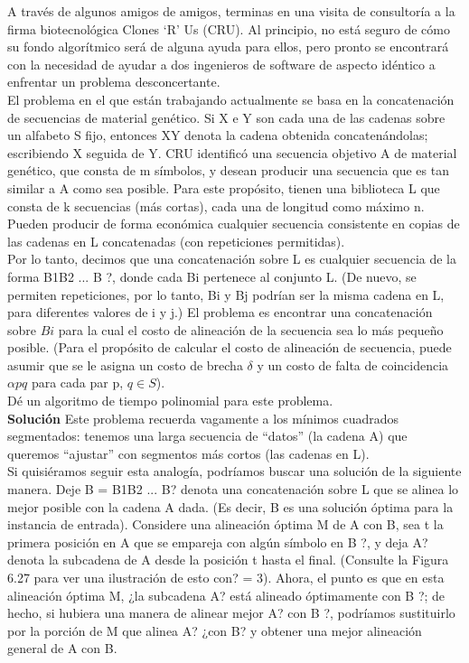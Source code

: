 \documentclass[a4paper, 12pt]{book}
\theoremstyle{dotless}
\begin{document}
A través de algunos amigos de amigos, terminas en una visita de consultoría a la firma biotecnológica Clones `R' Us (CRU). Al principio, no está seguro de cómo su fondo algorítmico será de alguna ayuda para ellos, pero pronto se encontrará con la necesidad de ayudar a dos ingenieros de software de aspecto idéntico a enfrentar un problema desconcertante.\\

El problema en el que están trabajando actualmente se basa en la concatenación de secuencias de material genético. Si X e Y son cada una de las cadenas sobre un alfabeto S fijo, entonces XY denota la cadena obtenida concatenándolas; escribiendo X seguida de Y. CRU identificó una secuencia objetivo A de material genético, que consta de m símbolos, y desean producir una secuencia que es tan similar a A como sea posible. Para este propósito, tienen una biblioteca L que consta de k secuencias (más cortas), cada una de longitud como máximo n. Pueden producir de forma económica cualquier secuencia consistente en copias de las cadenas en L concatenadas (con repeticiones permitidas).\\

Por lo tanto, decimos que una concatenación sobre L es cualquier secuencia de la forma B1B2 ... B ?, donde cada Bi pertenece al conjunto L. (De nuevo, se permiten repeticiones, por lo tanto, Bi y Bj podrían ser la misma cadena en L, para diferentes valores de i y j.) El problema es encontrar una concatenación sobre ${Bi}$ para la cual el costo de alineación de la secuencia sea lo más pequeño posible. (Para el propósito de calcular el costo de alineación de secuencia, puede asumir que se le asigna un costo de brecha $ \delta $ y un costo de falta de coincidencia $ \alpha pq$ para cada par p, $q \in S$).\\

Dé un algoritmo de tiempo polinomial para este problema.\\

\textbf{Solución} Este problema recuerda vagamente a los mínimos cuadrados segmentados: tenemos una larga secuencia de ``datos'' (la cadena A) que queremos ``ajustar'' con segmentos más cortos (las cadenas en L).\\

Si quisiéramos seguir esta analogía, podríamos buscar una solución de la siguiente manera. Deje B = B1B2 ... B? denota una concatenación sobre L que se alinea lo mejor posible con la cadena A dada. (Es decir, B es una solución óptima para la instancia de entrada). Considere una alineación óptima M de A con B, sea t la primera posición en A que se empareja con algún símbolo en B ?, y deja A? denota la subcadena de A desde la posición t hasta el final. (Consulte la Figura 6.27 para ver una ilustración de esto con? = 3). Ahora, el punto es que en esta alineación óptima M, ¿la subcadena A? está alineado óptimamente con B ?; de hecho, si hubiera una manera de alinear mejor A? con B ?, podríamos sustituirlo por la porción de M que alinea A? ¿con B? y obtener una mejor alineación general de A con B.\\
\end{document}
